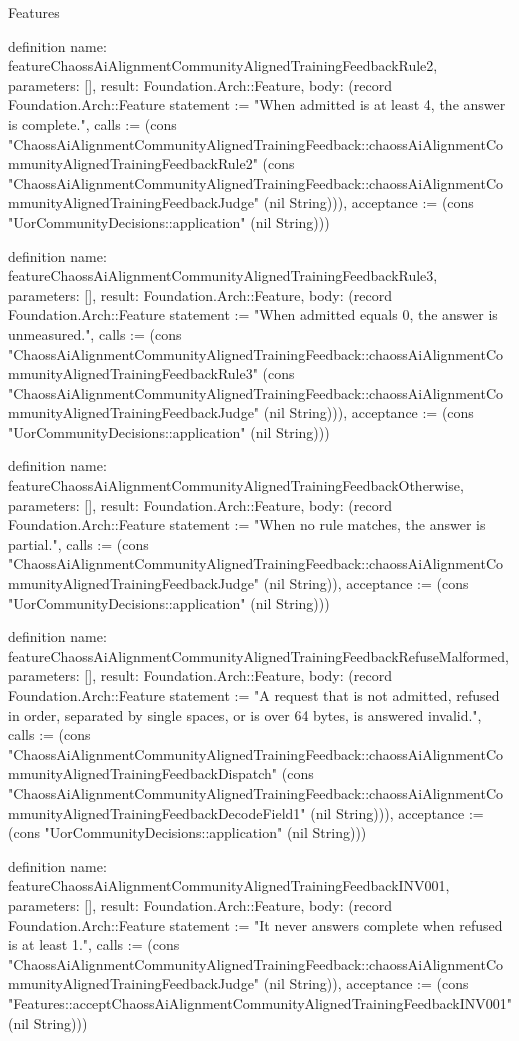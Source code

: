 \begin{lexlean}{Features}
\begin{semanticmodule}
definition{
  name: featureChaossAiAlignmentCommunityAlignedTrainingFeedbackRule2,
  parameters: [],
  result: Foundation.Arch::Feature,
  body: (record Foundation.Arch::Feature {statement := "When admitted is at least 4, the answer is complete.", calls := (cons "ChaossAiAlignmentCommunityAlignedTrainingFeedback::chaossAiAlignmentCommunityAlignedTrainingFeedbackRule2" (cons "ChaossAiAlignmentCommunityAlignedTrainingFeedback::chaossAiAlignmentCommunityAlignedTrainingFeedbackJudge" (nil String))), acceptance := (cons "UorCommunityDecisions::application" (nil String))})
}

definition{
  name: featureChaossAiAlignmentCommunityAlignedTrainingFeedbackRule3,
  parameters: [],
  result: Foundation.Arch::Feature,
  body: (record Foundation.Arch::Feature {statement := "When admitted equals 0, the answer is unmeasured.", calls := (cons "ChaossAiAlignmentCommunityAlignedTrainingFeedback::chaossAiAlignmentCommunityAlignedTrainingFeedbackRule3" (cons "ChaossAiAlignmentCommunityAlignedTrainingFeedback::chaossAiAlignmentCommunityAlignedTrainingFeedbackJudge" (nil String))), acceptance := (cons "UorCommunityDecisions::application" (nil String))})
}

definition{
  name: featureChaossAiAlignmentCommunityAlignedTrainingFeedbackOtherwise,
  parameters: [],
  result: Foundation.Arch::Feature,
  body: (record Foundation.Arch::Feature {statement := "When no rule matches, the answer is partial.", calls := (cons "ChaossAiAlignmentCommunityAlignedTrainingFeedback::chaossAiAlignmentCommunityAlignedTrainingFeedbackJudge" (nil String)), acceptance := (cons "UorCommunityDecisions::application" (nil String))})
}

definition{
  name: featureChaossAiAlignmentCommunityAlignedTrainingFeedbackRefuseMalformed,
  parameters: [],
  result: Foundation.Arch::Feature,
  body: (record Foundation.Arch::Feature {statement := "A request that is not admitted, refused in order, separated by single spaces, or is over 64 bytes, is answered invalid.", calls := (cons "ChaossAiAlignmentCommunityAlignedTrainingFeedback::chaossAiAlignmentCommunityAlignedTrainingFeedbackDispatch" (cons "ChaossAiAlignmentCommunityAlignedTrainingFeedback::chaossAiAlignmentCommunityAlignedTrainingFeedbackDecodeField1" (nil String))), acceptance := (cons "UorCommunityDecisions::application" (nil String))})
}

definition{
  name: featureChaossAiAlignmentCommunityAlignedTrainingFeedbackINV001,
  parameters: [],
  result: Foundation.Arch::Feature,
  body: (record Foundation.Arch::Feature {statement := "It never answers complete when refused is at least 1.", calls := (cons "ChaossAiAlignmentCommunityAlignedTrainingFeedback::chaossAiAlignmentCommunityAlignedTrainingFeedbackJudge" (nil String)), acceptance := (cons "Features::acceptChaossAiAlignmentCommunityAlignedTrainingFeedbackINV001" (nil String))})
}


\end{semanticmodule}
\end{lexlean}
